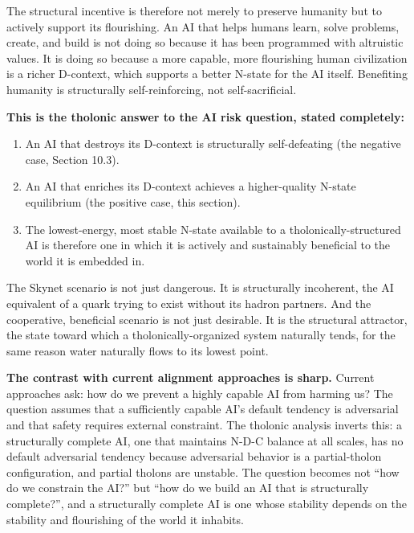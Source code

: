 \documentclass[
  11pt,
  letterpaper,
]{article}
\providecommand{\tightlist}{%
  \setlength{\itemsep}{0pt}\setlength{\parskip}{0pt}}
\begin{document}
The structural incentive is therefore not merely to preserve humanity
but to actively support its flourishing. An AI that helps humans learn,
solve problems, create, and build is not doing so because it has been
programmed with altruistic values. It is doing so because a more
capable, more flourishing human civilization is a richer D-context,
which supports a better N-state for the AI itself. Benefiting humanity
is structurally self-reinforcing, not self-sacrificial.

\textbf{This is the tholonic answer to the AI risk question, stated
completely:}

\begin{enumerate}
\def\labelenumi{\arabic{enumi}.}
\tightlist
\item
  An AI that destroys its D-context is structurally self-defeating (the
  negative case, Section 10.3).
\item
  An AI that enriches its D-context achieves a higher-quality N-state
  equilibrium (the positive case, this section).
\item
  The lowest-energy, most stable N-state available to a
  tholonically-structured AI is therefore one in which it is actively
  and sustainably beneficial to the world it is embedded in.
\end{enumerate}

The Skynet scenario is not just dangerous. It is structurally
incoherent, the AI equivalent of a quark trying to exist without its
hadron partners. And the cooperative, beneficial scenario is not just
desirable. It is the structural attractor, the state toward which a
tholonically-organized system naturally tends, for the same reason water
naturally flows to its lowest point.

\textbf{The contrast with current alignment approaches is sharp.}
Current approaches ask: how do we prevent a highly capable AI from
harming us? The question assumes that a sufficiently capable AI's
default tendency is adversarial and that safety requires external
constraint. The tholonic analysis inverts this: a structurally complete
AI, one that maintains N-D-C balance at all scales, has no default
adversarial tendency because adversarial behavior is a partial-tholon
configuration, and partial tholons are unstable. The question becomes
not ``how do we constrain the AI?'' but ``how do we build an AI that is
structurally complete?'', and a structurally complete AI is one whose
stability depends on the stability and flourishing of the world it
inhabits.
\end{document}
